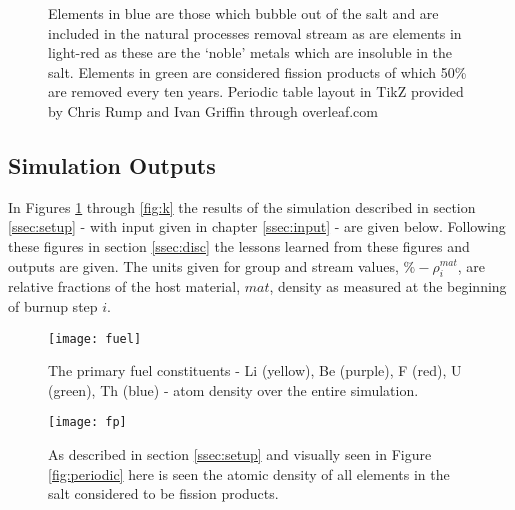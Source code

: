 \begin{figure}
\begin{centering}
\end{centering}
\caption{Elements in blue are those which bubble out of the salt and are
included in the natural processes removal stream as are elements in light-red
as these are the `noble' metals which are insoluble in the salt. Elements in
green are considered fission products of which 50\% are removed every ten
years. Periodic table layout in TikZ provided by Chris Rump and Ivan Griffin
through overleaf.com}
\end{figure}

\subsection{Simulation Outputs}\label{ssec:outputs}

In Figures \ref{fig:fuel} through \ref{fig:k} the results of the simulation
described in section \ref{ssec:setup} - with input given in chapter 
\ref{ssec:input} - are given below. Following these figures in section
\ref{ssec:disc} the lessons learned from these figures and outputs are
given. The units given for group and stream values, $\%-\rho^{mat}_{i}$, are
relative fractions of the host material, $mat$, density as measured at the 
beginning of burnup step $i$.

\begin{figure}[H]
    \centering
    \texttt{[image: fuel]}
    \caption{The primary fuel constituents - Li (yellow), Be (purple), F (red),
    U (green), Th (blue) - atom density over the entire simulation.}
    \label{fig:fuel}
\end{figure}

\begin{figure}[H]
    \centering
    \texttt{[image: fp]}
    \caption{As described in section \ref{ssec:setup} and visually seen in
    Figure \ref{fig:periodic} here is seen the atomic density of all elements
    in the salt considered to be fission products.}
    \label{fig:fp}
\end{figure}

